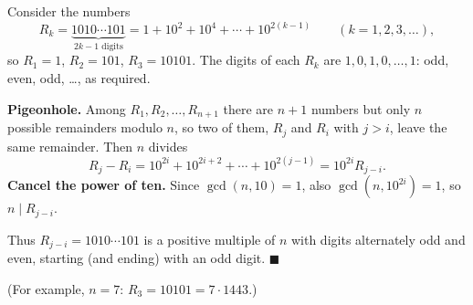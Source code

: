 Consider the numbers
\[
R_k=\underbrace{1010\cdots101}_{2k-1\text{ digits}}=1+10^2+10^4+\cdots+10^{2(k-1)}\qquad(k=1,2,3,\dots),
\]
so $R_1=1$, $R_2=101$, $R_3=10101$. The digits of each $R_k$ are $1,0,1,0,\dots,1$: odd, even, odd, \dots, as required.

\textbf{Pigeonhole.} Among $R_1,R_2,\dots,R_{n+1}$ there are $n+1$ numbers but only $n$ possible remainders modulo $n$, so two of them, $R_j$ and $R_i$ with $j>i$, leave the same remainder. Then $n$ divides
\[
R_j-R_i=10^{2i}+10^{2i+2}+\cdots+10^{2(j-1)}=10^{2i}R_{j-i}.
\]
\textbf{Cancel the power of ten.} Since $\gcd(n,10)=1$, also $\gcd\left(n,10^{2i}\right)=1$, so $n\mid R_{j-i}$.

Thus $R_{j-i}=1010\cdots101$ is a positive multiple of $n$ with digits alternately odd and even, starting (and ending) with an odd digit. $\blacksquare$

(For example, $n=7$: $R_3=10101=7\cdot1443$.)
